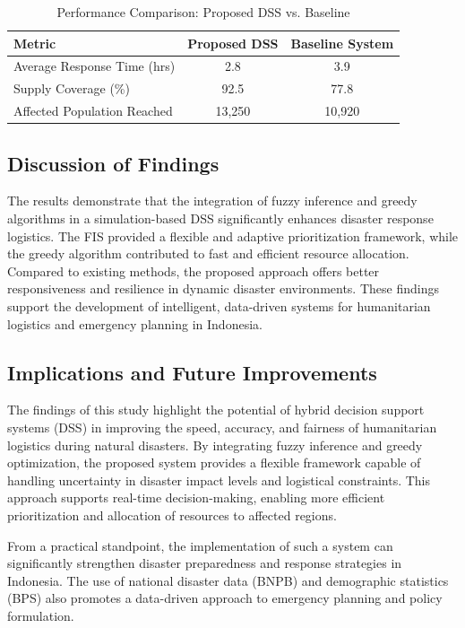 \documentclass[journal,final,a4paper,twoside,11pt]{IEEEtran}
\begin{document}
\begin{table}[htbp]
\caption{Performance Comparison: Proposed DSS vs. Baseline}
\begin{center}
\begin{tabular}{|l|c|c|}
\hline
\textbf{Metric} & \textbf{Proposed DSS} & \textbf{Baseline System} \\
\hline
Average Response Time (hrs) & 2.8 & 3.9 \\
Supply Coverage (\%) & 92.5 & 77.8 \\
Affected Population Reached & 13,250 & 10,920 \\
\hline
\end{tabular}
\label{tab:performance}
\end{center}
\end{table}

\subsection{Discussion of Findings}
The results demonstrate that the integration of fuzzy inference and greedy algorithms in a simulation-based DSS significantly enhances disaster response logistics. The FIS provided a flexible and adaptive prioritization framework, while the greedy algorithm contributed to fast and efficient resource allocation. Compared to existing methods, the proposed approach offers better responsiveness and resilience in dynamic disaster environments. These findings support the development of intelligent, data-driven systems for humanitarian logistics and emergency planning in Indonesia.

\subsection{Implications and Future Improvements}

The findings of this study highlight the potential of hybrid decision support systems (DSS) in improving the speed, accuracy, and fairness of humanitarian logistics during natural disasters. By integrating fuzzy inference and greedy optimization, the proposed system provides a flexible framework capable of handling uncertainty in disaster impact levels and logistical constraints. This approach supports real-time decision-making, enabling more efficient prioritization and allocation of resources to affected regions.

From a practical standpoint, the implementation of such a system can significantly strengthen disaster preparedness and response strategies in Indonesia. The use of national disaster data (BNPB) and demographic statistics (BPS) also promotes a data-driven approach to emergency planning and policy formulation.
\end{document}
